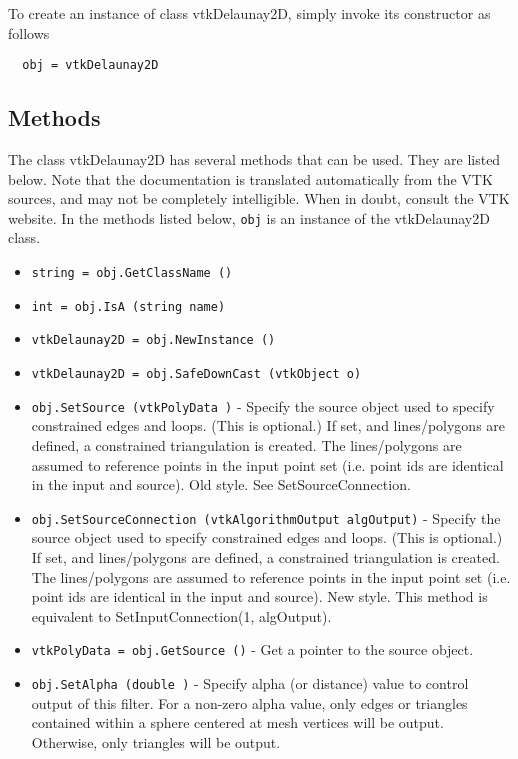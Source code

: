 To create an instance of class vtkDelaunay2D, simply
invoke its constructor as follows
\begin{verbatim}
  obj = vtkDelaunay2D
\end{verbatim}
\subsection{Methods}

The class vtkDelaunay2D has several methods that can be used.
  They are listed below.
Note that the documentation is translated automatically from the VTK sources,
and may not be completely intelligible.  When in doubt, consult the VTK website.
In the methods listed below, \verb|obj| is an instance of the vtkDelaunay2D class.
\begin{itemize}
\item  \verb|string = obj.GetClassName ()|

\item  \verb|int = obj.IsA (string name)|

\item  \verb|vtkDelaunay2D = obj.NewInstance ()|

\item  \verb|vtkDelaunay2D = obj.SafeDownCast (vtkObject o)|

\item  \verb|obj.SetSource (vtkPolyData )| -  Specify the source object used to specify constrained edges and loops.
 (This is optional.) If set, and lines/polygons are defined, a constrained
 triangulation is created. The lines/polygons are assumed to reference
 points in the input point set (i.e. point ids are identical in the
 input and source).
 Old style. See SetSourceConnection.

\item  \verb|obj.SetSourceConnection (vtkAlgorithmOutput algOutput)| -  Specify the source object used to specify constrained edges and loops.
 (This is optional.) If set, and lines/polygons are defined, a constrained
 triangulation is created. The lines/polygons are assumed to reference
 points in the input point set (i.e. point ids are identical in the
 input and source).
 New style. This method is equivalent to SetInputConnection(1, algOutput).

\item  \verb|vtkPolyData = obj.GetSource ()| -  Get a pointer to the source object.

\item  \verb|obj.SetAlpha (double )| -  Specify alpha (or distance) value to control output of this filter.
 For a non-zero alpha value, only edges or triangles contained within
 a sphere centered at mesh vertices will be output. Otherwise, only
 triangles will be output.


\end{itemize}
